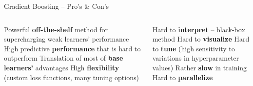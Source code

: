 \begin{frame}{Gradient Boosting -- Pro's \& Con's}

\footnotesize

\begin{columns}[onlytextwidth]
  \begin{column}{0.5\textwidth}
    \footnotesize
    \begin{itemize}
      \positem Powerful \textbf{off-the-shelf} method for supercharging weak 
      learners' performance
      \positem High predictive \textbf{performance} that is hard to outperform
      \positem Translation of most of \textbf{base learners'} advantages 
      \positem High \textbf{flexibility} (custom loss functions, many tuning 
      options) 
    \end{itemize}
  \end{column}
  \begin{column}{0.5\textwidth}
    \footnotesize
    \begin{itemize}
      \negitem Hard to \textbf{interpret} -- black-box method
      \negitem Hard to \textbf{visualize}
      \negitem Hard to \textbf{tune} (high sensitivity to variations in 
      hyperparameter values)
      \negitem Rather \textbf{slow} in training
      \negitem Hard to \textbf{parallelize}
    \end{itemize}
  \end{column}
\end{columns}

\vfill

\small


\end{frame}


